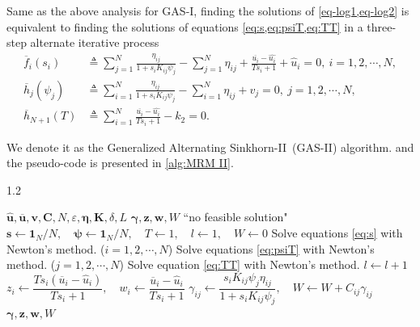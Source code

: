\documentclass[review,hidelinks,onefignum,onetabnum]{siamart220329}
\begin{document}
Same as the above analysis for GAS-I, finding the solutions of \cref{eq-log1,eq-log2} is equivalent to finding the solutions of equations \cref{eq:s,eq:psiT,eq:TT} in a three-step alternate iterative process
\begin{align}
    \overline{f}_i(s_i) &\triangleq \sum_{j=1}^{N}\frac{\eta_{ij}}{1+s_i K_{ij} \psi_j}-\sum_{j=1}^{N} \eta_{ij}+\frac{\overline{u_i}-\hat{u_i}}{T s_i+1} +\hat{u}_i=0,\ i=1,2,\cdots ,N,\label{eq:s}\\
    \overline{h}_j(\psi_j) &\triangleq \sum_{i=1}^{N}\frac{\eta_{ij}}{1+s_i K_{ij} \psi_j}- \sum_{i=1}^{N} \eta_{ij}+v_j=0,\ j=1,2,\cdots ,N,\label{eq:psiT}\\
    \overline{h}_{N+1}(T) &\triangleq \sum_{i=1}^{N} \frac{\overline{u_i}-\hat{u_i}}{T s_i+1} -k_2=0.\label{eq:TT}
\end{align}


We denote it as the Generalized Alternating Sinkhorn-II~(GAS-II) algorithm. and the pseudo-code is presented in \cref{alg:MRM II}. 

\renewcommand{\thealgorithm}{II}
\begin{algorithm}[t]
	\renewcommand{\algorithmicrequire}{\textbf{Input:}}
	\renewcommand{\algorithmicensure}{\textbf{Output:}}
            \caption{The GAS-II Algorithm for the OPT Model}
		\label{alg:MRM II}
            \begin{spacing}{1.2}
		\begin{algorithmic}[1]
			\REQUIRE $\bm{\hat{u}},\bm{\overline{u}},\bm{v},\bm{C},N,\varepsilon,\bm{\eta},\bm{K}, \delta,L$
			\ENSURE $\bm{\gamma}, \bm{z}, \bm{w}, W$
             ``no feasible solution"
            \ENDIF
			\STATE $\bm{s}\leftarrow \bm{1}_N/N,\quad \bm{\psi}\leftarrow  \bm{1}_N/N,\quad T\leftarrow 1, \quad l\leftarrow  1, \quad W\leftarrow 0$
			\STATE  Solve equations \cref{eq:s} with Newton's method. ($i=1,2,\cdots ,N$)
			\STATE  Solve equations \cref{eq:psiT} with Newton's method. ($j=1,2,\cdots ,N$)
            \STATE  Solve equation \cref{eq:TT} with Newton's method. 
			\STATE $l\leftarrow l+1$
			\ENDWHILE
            \STATE $z_i\leftarrow \dfrac{Ts_i(\overline{u}_i-\hat{u}_i)}{Ts_i+1},\quad w_i \leftarrow  \dfrac{\overline{u}_i-\hat{u}_i}{Ts_i+1}$
			\STATE $\gamma_{ij}\leftarrow \dfrac{s_i K_{ij} \psi_j\eta_{ij}}{1+s_i K_{ij} \psi_j}, \quad W\leftarrow  W+C_{ij}\gamma_{ij}$
			\ENDFOR
			\ENDFOR
            \RETURN $\bm{\gamma}, \bm{z}, \bm{w}, W$
		\end{algorithmic}
            \end{spacing}
\end{algorithm}
\end{document}
